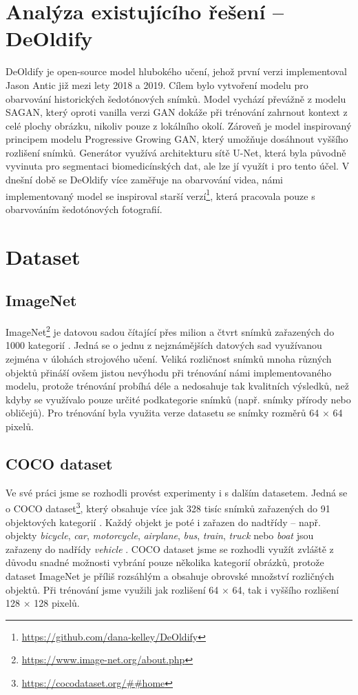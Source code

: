 \documentclass[12pt, a4paper]{article}
\begin{document}
    \section{Analýza existujícího řešení -- DeOldify}
    DeOldify \cite{deoldify} je open-source model hlubokého učení, jehož první verzi implementoval Jason Antic již mezi lety 2018 a 2019. Cílem bylo vytvoření modelu pro obarvování historických šedotónových snímků. Model vychází převážně z modelu SAGAN, který oproti vanilla verzi GAN dokáže při trénování zahrnout kontext z celé plochy obrázku, nikoliv pouze z lokálního okolí. Zároveň je model inspirovaný principem modelu Progressive Growing GAN, který umožňuje dosáhnout vyššího rozlišení snímků. Generátor využívá architekturu sítě U-Net, která byla původně vyvinuta pro segmentaci biomedicínských dat, ale lze jí  využít i pro tento účel. V dnešní době se DeOldify více zaměřuje na obarvování videa, námi implementovaný model se inspiroval starší verzí\footnote{\url{https://github.com/dana-kelley/DeOldify}}, která pracovala pouze s obarvováním šedotónových fotografií.
    
    \section{Dataset}
    
    \subsection{ImageNet}\label{section:ImageNet}
    ImageNet\footnote{\url{https://www.image-net.org/about.php}} je datovou sadou čítající přes milion a čtvrt snímků zařazených do 1000 kategorií \cite{ImageNetStats}. Jedná se o jednu z nejznámějších datových sad využívanou zejména v úlohách strojového učení. Veliká rozličnost snímků mnoha různých objektů přináší ovšem jistou nevýhodu při trénování námi implementovaného modelu, protože trénování probíhá déle a nedosahuje tak kvalitních výsledků, než kdyby se využívalo pouze určité podkategorie snímků (např. snímky přírody nebo obličejů). Pro trénování byla využita verze datasetu se snímky rozměrů 64 $\times$ 64 pixelů.
    
    \subsection{COCO dataset}
    Ve své práci jsme se rozhodli provést experimenty i s dalším datasetem. Jedná se o COCO dataset\footnote{\url{https://cocodataset.org/##home}}, který obsahuje více jak 328 tisíc snímků zařazených do 91 objektových kategorií \cite{lin2015microsoft}. Každý objekt je poté i zařazen do nadtřídy -- např. objekty \textit{bicycle}, \textit{car}, \textit{motorcycle}, \textit{airplane}, \textit{bus}, \textit{train}, \textit{truck} nebo \textit{boat} jsou zařazeny do nadřídy \textit{vehicle} \cite{CocoCategories}. COCO dataset jsme se rozhodli využít zvláště z důvodu snadné možnosti vybrání pouze několika kategorií obrázků, protože dataset ImageNet je příliš rozsáhlým a obsahuje obrovské množství rozličných objektů. Při trénování jsme využili jak rozlišení 64 $\times$ 64, tak i vyššího rozlišení 128 $\times$ 128 pixelů.
    
\end{document}
